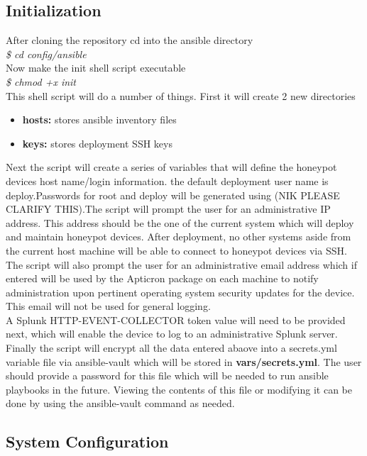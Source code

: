 \subsection{Initialization}
After cloning the repository cd into the ansible directory
\\\newline
\textit{\$ cd config/ansible}
\\\newline
Now make the init shell script executable
\\\newline
\textit{\$ chmod +x init}
\\\newline
This shell script will do a number of things. First it will create 2 new directories
\begin{itemize}
\item \textbf{hosts:} stores ansible inventory files
\item \textbf{keys:} stores deployment SSH keys
\end{itemize}
Next the script will create a series of variables that will define the honeypot devices host name/login information. the default deployment user name is deploy.Passwords for root and deploy will be generated using (NIK PLEASE CLARIFY THIS).The script will prompt the user for an administrative IP address. This address should be the one of the current system which will deploy and maintain honeypot devices. After deployment, no other systems aside from the current host machine will be able to connect to honeypot devices via SSH.
\\The script will also prompt the user for an administrative email address which if entered will be used by the Apticron package on each machine to notify administration upon pertinent operating system security updates for the device. This email will not be used for general logging.
\\A Splunk HTTP-EVENT-COLLECTOR token value will need to be provided next, which will enable the device to log to an administrative Splunk server. Finally the script will encrypt all the data entered abaove into a secrets.yml variable file via ansible-vault which will be stored in \textbf{vars/secrets.yml}. The user should provide a password for this file which will be needed to run ansible playbooks in the future. Viewing the contents of this file or modifying it can be done by using the ansible-vault command as needed.

\subsection{System Configuration}

